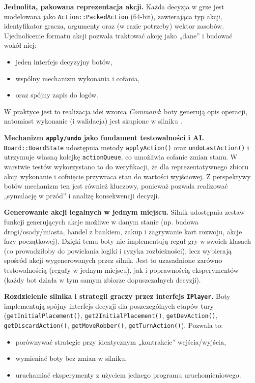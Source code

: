 \documentclass[polish,inz,longabstract]{iithesis}
\begin{document}
\textbf{Jednolita, pakowana reprezentacja akcji.} Każda decyzja w grze jest modelowana jako \texttt{Action::PackedAction} (64-bit), zawierająca typ akcji, identyfikator gracza, argumenty oraz (w razie potrzeby) wektor zasobów. Ujednolicenie formatu akcji pozwala traktować akcję jako „dane” i budować wokół niej:
\begin{itemize}
\item jeden interfejs decyzyjny botów,
\item wspólny mechanizm wykonania i cofania,
\item oraz spójny zapis do logów.
\end{itemize}

W praktyce jest to realizacja idei wzorca \textit{Command}: boty generują opis operacji, natomiast wykonanie (i walidacja) jest skupione w silniku \cite{13}.

\textbf{Mechanizm \texttt{apply/undo} jako fundament testowalności i AI.} \newline \texttt{Board::BoardState} udostępnia metody \texttt{applyAction()} oraz \texttt{undoLastAction()} i utrzymuje własną kolejkę \texttt{actionQueue}, co umożliwia cofanie zmian stanu. W warstwie testów wykorzystano to do weryfikacji, że dla reprezentatywnego zbioru akcji wykonanie i cofnięcie przywraca stan do wartości wyjściowej. Z perspektywy botów mechanizm ten jest również kluczowy, ponieważ pozwala realizować „symulację w przód” i analizę konsekwencji decyzji.

\textbf{Generowanie akcji legalnych w jednym miejscu.} Silnik udostępnia zestaw funkcji generujących akcje możliwe w danym stanie (np. budowa drogi/osady/miasta, handel z bankiem, zakup i zagrywanie kart rozwoju, akcje fazy początkowej). Dzięki temu boty nie implementują reguł gry w swoich klasach (co prowadziłoby do powielania logiki i ryzyka rozbieżności), lecz wybierają spośród akcji wygenerowanych przez silnik. Jest to uzasadnione zarówno testowalnością (reguły w jednym miejscu), jak i poprawnością eksperymentów (każdy bot działa w tym samym zbiorze dopuszczalnych decyzji).

\textbf{Rozdzielenie silnika i strategii graczy przez interfejs \texttt{IPlayer}.} Boty implementują spójny interfejs decyzji dla poszczególnych etapów tury \newline (\texttt{getInitialPlacement()}, \texttt{get2InitialPlacement()}, \texttt{getDevAction()}, \newline \texttt{getDiscardAction()}, \texttt{getMoveRobber()}, \texttt{getTurnAction()}). Pozwala to:
\begin{itemize}
\item porównywać strategie przy identycznym „kontrakcie” wejścia/wyjścia,
\item wymieniać boty bez zmian w silniku,
\item uruchamiać eksperymenty z użyciem jednego programu uruchomieniowego.
\end{itemize}
\end{document}
